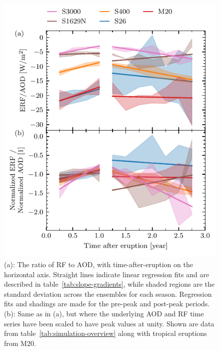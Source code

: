 \documentclass[draft]{agujournal2019}
\begin{document}
  \begin{figure}
    \centering \includegraphics{figure3}

    \caption{(a): The ratio of RF to AOD, with
      time-after-eruption on the horizontal axis. Straight lines indicate linear
      regression fits and are described in table~\ref{tab:slope-gradients}, while shaded
      regions are the standard deviation across the ensembles for each season.
      Regression fits and shadings are made for the pre-peak and post-peak periods. (b):
      Same as in (a), but where the underlying AOD and RF time series have been scaled
      to have peak values at unity. Shown are data from
      table~\ref{tab:simulation-overview} along with tropical eruptions from
      M20.}\label{fig:3_rf_to_aod_ratios}%
  \end{figure}
\end{document}
